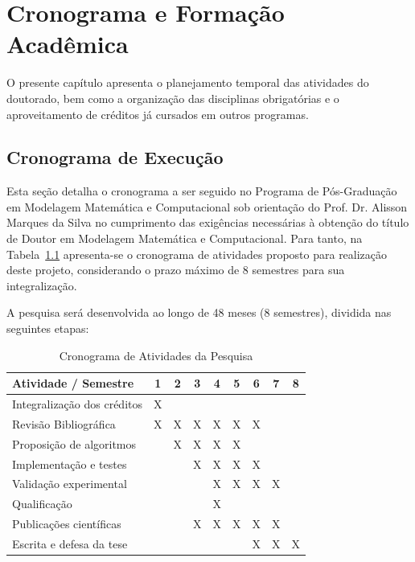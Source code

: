 \chapter{Cronograma e Formação Acadêmica}
\label{chap:cronograma}

O presente capítulo apresenta o planejamento temporal das atividades do doutorado, bem como a organização das disciplinas obrigatórias e o aproveitamento de créditos já cursados em outros programas.

\section{Cronograma de Execução}

Esta seção detalha o cronograma a ser seguido no Programa de Pós-Graduação em Modelagem Matemática e Computacional sob orientação do Prof. Dr. Alisson Marques da Silva no cumprimento das exigências necessárias à obtenção do título de Doutor em Modelagem Matemática e Computacional. Para tanto, na Tabela~\ref{tab:cronograma} apresenta-se o cronograma de atividades proposto para realização deste projeto, considerando o prazo máximo de 8 semestres para sua integralização.

A pesquisa será desenvolvida ao longo de 48 meses (8 semestres), dividida nas seguintes etapas:

\begin{table}[h]
\centering
\caption{Cronograma de Atividades da Pesquisa}
\label{tab:cronograma}
\begin{tabular}{|l|c|c|c|c|c|c|c|c|}
\hline
\textbf{Atividade / Semestre} & \textbf{1} & \textbf{2} & \textbf{3} & \textbf{4} & \textbf{5} & \textbf{6} & \textbf{7} & \textbf{8} \\
\hline
Integralização dos créditos & X & & & & & & & \\
\hline
Revisão Bibliográfica & X & X & X & X & X & X & & \\
\hline
Proposição de algoritmos & & X & X & X & X & & & \\
\hline
Implementação e testes & & & X & X & X & X & & \\
\hline
Validação experimental & & & & X & X & X & X & \\
\hline
Qualificação & & & & X & & & & \\
\hline
Publicações científicas & & & X & X & X & X & X & \\
\hline
Escrita e defesa da tese & & & & & & X & X & X \\
\hline
\end{tabular}
\end{table}

